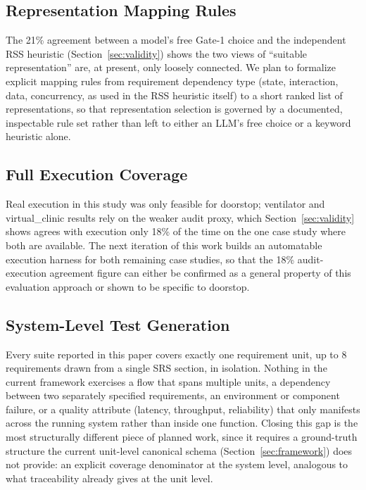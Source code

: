 \documentclass[conference]{IEEEtran}
\begin{document}
\subsection{Representation Mapping Rules}
The 21\% agreement between a model's free Gate-1 choice and the independent
RSS heuristic (Section~\ref{sec:validity}) shows the two views of
``suitable representation'' are, at present, only loosely connected. We plan
to formalize explicit mapping rules from requirement dependency type (state,
interaction, data, concurrency, as used in the RSS heuristic itself) to a
short ranked list of representations, so that representation selection is
governed by a documented, inspectable rule set rather than left to either an
LLM's free choice or a keyword heuristic alone.

\subsection{Full Execution Coverage}
Real execution in this study was only feasible for doorstop; ventilator and
virtual\_clinic results rely on the weaker audit proxy, which
Section~\ref{sec:validity} shows agrees with execution only 18\% of the time
on the one case study where both are available. The next iteration of this
work builds an automatable execution harness for both remaining case studies,
so that the 18\% audit-execution agreement figure can either be confirmed as
a general property of this evaluation approach or shown to be specific to
doorstop.

\subsection{System-Level Test Generation}
\label{sec:sysleveltesting}
Every suite reported in this paper covers exactly one requirement unit, up
to 8 requirements drawn from a single SRS section, in isolation. Nothing in
the current framework exercises a flow that spans multiple units, a
dependency between two separately specified requirements, an environment or
component failure, or a quality attribute (latency, throughput, reliability)
that only manifests across the running system rather than inside one
function. Closing this gap is the most structurally different piece of
planned work, since it requires a ground-truth structure the current
unit-level canonical schema (Section~\ref{sec:framework}) does not provide:
an explicit coverage denominator at the system level, analogous to what
traceability already gives at the unit level.
\end{document}
